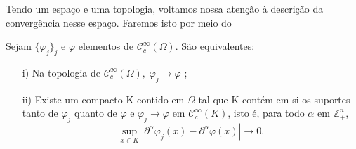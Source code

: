 \documentclass[../distribution_theory_notes.tex]{subfiles}
\begin{document}
     Tendo um espaço e uma topologia, voltamos nossa atenção à descrição da convergência nesse espaço. Faremos isto por meio do 
    \begin{theorem*}
    Sejam \(\{\varphi_{j}\}_{j}\) e \(\varphi \) elementos de \(\mathcal{C}_{c}^{\infty}(\Omega )\). São equivalentes: 
   \begin{itemize}
     \item[i)] Na topologia de \(\mathcal{C}_{c}^{\infty}(\Omega ),\; \varphi_{j}\rightarrow \varphi \) ; 
     \item[ii)] Existe um compacto K contido em \(\Omega \) tal que K contém em si os suportes tanto de \(\varphi_{j}\) quanto de \(\varphi \) e \(\varphi_{j}\rightarrow \varphi \) em \(\mathcal{C}_{c}^{\infty}(K)\), isto é, para todo \(\alpha \) em \(\mathbb{Z}_{+}^{n}\), 
       \[
       \sup_{x\in K}|\partial^{\alpha }\varphi_{j}(x)-\partial^{\alpha }\varphi (x)|\rightarrow 0.
       \]
   \end{itemize}
    \end{theorem*}
\end{document}
